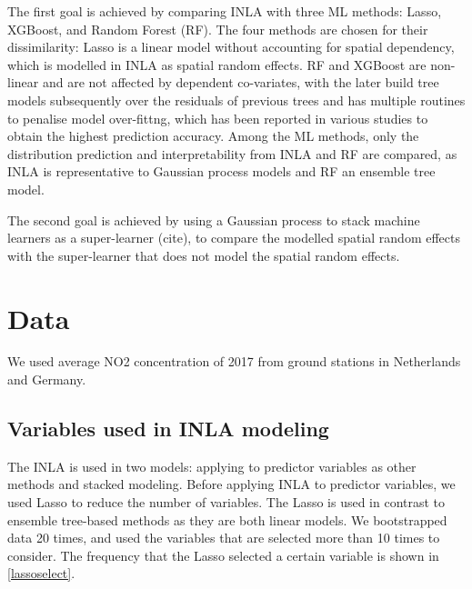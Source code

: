 \documentclass{article}
\begin{document}
The first goal is achieved by comparing INLA with three ML methods: Lasso, XGBoost, and Random Forest (RF). The four methods are chosen for their dissimilarity: Lasso is a linear model without accounting for spatial dependency, which is modelled in INLA as spatial random effects. RF and XGBoost are non-linear and are not affected by dependent co-variates, with the later build tree models subsequently over the residuals of previous trees and has multiple routines to penalise model over-fittng, which has been reported in various studies to obtain the highest prediction accuracy. Among the ML methods, only the distribution prediction and interpretability from INLA and RF are compared, as INLA is representative to Gaussian process models and RF an ensemble tree model.

The second goal is achieved by using a Gaussian process to stack machine learners as a super-learner (cite), to compare the modelled spatial random effects with the super-learner that does not model the spatial random effects. 

 
 
\section{Data}
We used average NO2 concentration of 2017 from ground stations in Netherlands and Germany.

\subsection{Variables used in INLA modeling} 
The INLA is used in two models:  applying to predictor variables as other methods and stacked modeling. Before applying INLA to predictor variables, we used Lasso to reduce the number of variables. The Lasso is used in contrast to ensemble tree-based methods as they are both linear models. We bootstrapped data 20 times, and used the variables that are selected more than 10 times to consider. The frequency that the Lasso selected a certain variable is shown in \cref{lassoselect}.
\end{document}
